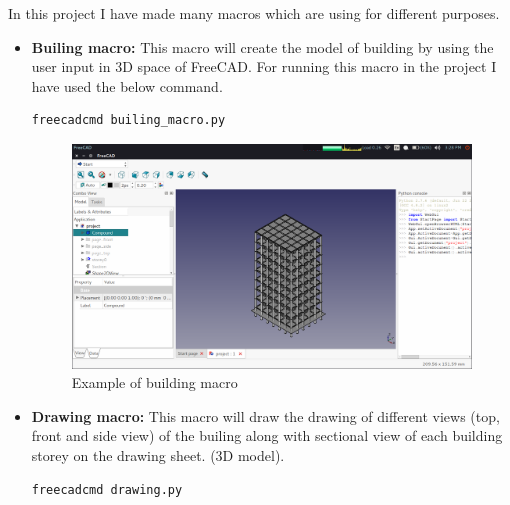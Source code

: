 In this project I have made many macros which are using for different purposes.
\begin{itemize}
\item \textbf{Builing macro:} This macro will create the model of building by
using the user input in 3D space of FreeCAD. For running this macro in the 
project I have used the below command.
\begin{lstlisting}
freecadcmd builing_macro.py
\end{lstlisting}
\begin{figure}[h!]                                                      
\begin{center}                                                          
\includegraphics[scale=0.35]{images/building_macro.png}
\caption{Example of building macro}                                   
\end{center}                                                            
\end{figure}
\item \textbf{Drawing macro:} This macro will draw the drawing of different 
views (top, front and side view) of the builing along with sectional view of each 
building storey on the drawing sheet.
(3D model).
\begin{lstlisting}                                                      
freecadcmd drawing.py                                                
\end{lstlisting}
\begin{figure}[h!]                                                      
\begin{center}                                                          

\end{center}
\end{figure}
\end{itemize}
